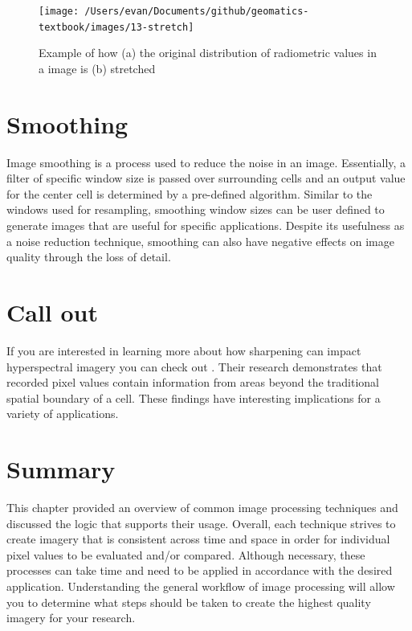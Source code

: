 \documentclass[
]{book}
\begin{document}
\begin{figure}
\texttt{[image: /Users/evan/Documents/github/geomatics-textbook/images/13-stretch]} \caption{Example of how (a) the original distribution of radiometric values in a image is (b) stretched}\label{fig:13-stretch}
\end{figure}

\hypertarget{smoothing}{%
\section{Smoothing}\label{smoothing}}

Image smoothing is a process used to reduce the noise in an image.
Essentially, a filter of specific window size is passed over surrounding
cells and an output value for the center cell is determined by a
pre-defined algorithm. Similar to the windows used for resampling,
smoothing window sizes can be user defined to generate images that are
useful for specific applications. Despite its usefulness as a noise
reduction technique, smoothing can also have negative effects on image
quality through the loss of detail.

\hypertarget{call-out-3}{%
\section*{Call out}\label{call-out-3}}

If you are interested in learning more about how sharpening can impact
hyperspectral imagery you can check out \citep{inamdar2020}. Their research
demonstrates that recorded pixel values contain information from areas
beyond the traditional spatial boundary of a cell. These findings have
interesting implications for a variety of applications.

\hypertarget{summary-10}{%
\section{Summary}\label{summary-10}}

This chapter provided an overview of common image processing techniques
and discussed the logic that supports their usage. Overall, each
technique strives to create imagery that is consistent across time and
space in order for individual pixel values to be evaluated and/or
compared. Although necessary, these processes can take time and need to
be applied in accordance with the desired application. Understanding the
general workflow of image processing will allow you to determine what
steps should be taken to create the highest quality imagery for your
research.
\end{document}
